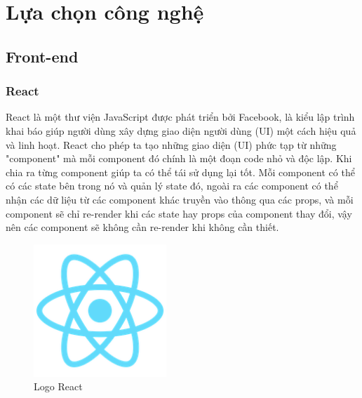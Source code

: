 \section{Lựa chọn công nghệ}

    \subsection{Front-end}
        \subsubsection{React}
            \hspace*{0.5cm} React là một thư viện JavaScript được phát triển bởi Facebook, là kiểu lập trình khai báo giúp người dùng xây dựng giao diện người dùng (UI) một cách hiệu quả và linh hoạt. React cho phép ta tạo những giao diện (UI) phức tạp từ những "component" mà mỗi component đó chính là một đoạn code nhỏ và độc lập. Khi chia ra từng component giúp ta có thể tái sử dụng lại tốt. Mỗi component có thể có các state bên trong nó và quản lý state đó, ngoài ra các component có thể nhận các dữ liệu từ các component khác truyền vào thông qua các props, và mỗi component sẽ chỉ re-render khi các state hay props của component thay đổi, vậy nên các component sẽ không cần re-render khi không cần thiết.\\
            
            \begin{figure}[!htp]
                \begin{center}
                \includegraphics[width=5cm]{img/Technology/react.png}
                \end{center}
                \caption{Logo React}
            \end{figure}

